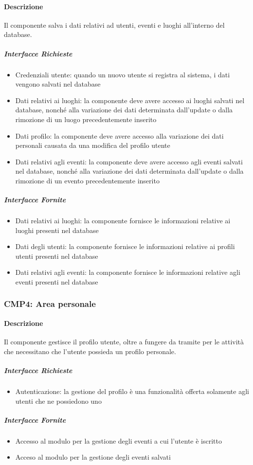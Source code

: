 \documentclass[9pt]{extarticle}
\begin{document}
\paragraph{Descrizione}
Il componente salva i dati relativi ad utenti, eventi e luoghi all'interno del database.
\subparagraph{Interfacce Richieste}
\begin{itemize}
	\item Credenziali utente: quando un nuovo utente si registra al sistema, i dati vengono salvati nel database
	\item Dati relativi ai luoghi: la componente deve avere accesso ai luoghi salvati nel database, nonché alla variazione dei dati determinata dall'update o dalla rimozione di un luogo precedentemente inserito
	\item Dati profilo: la componente deve avere accesso alla variazione dei dati personali causata da una modifica del profilo utente
	\item Dati relativi agli eventi: la componente deve avere accesso agli eventi salvati nel database, nonché  alla variazione dei dati determinata dall'update o dalla rimozione di un evento precedentemente inserito
\end{itemize}
\subparagraph{Interfacce Fornite}
\begin{itemize}
	\item Dati relativi ai luoghi: la componente fornisce le informazioni relative ai luoghi presenti nel database
	\item Dati degli utenti: la componente fornisce le informazioni relative ai profili utenti presenti nel database
	\item Dati relativi agli eventi: la componente fornisce le informazioni relative agli eventi presenti nel database
\end{itemize}



\subsubsection*{CMP4: Area personale}
\paragraph{Descrizione}
Il componente gestisce il profilo utente, oltre a fungere da tramite per le attività che necessitano che l'utente possieda un profilo personale.

\subparagraph{Interfacce Richieste}
\begin{itemize}
	\item Autenticazione: la gestione del profilo è una funzionalità offerta solamente agli utenti che ne possiedono uno
\end{itemize}
\subparagraph{Interfacce Fornite}
\begin{itemize}
	\item Accesso al modulo per la gestione degli eventi a cui l'utente è iscritto
	\item Acceso al modulo per la gestione degli eventi salvati
\end{itemize}
\end{document}
